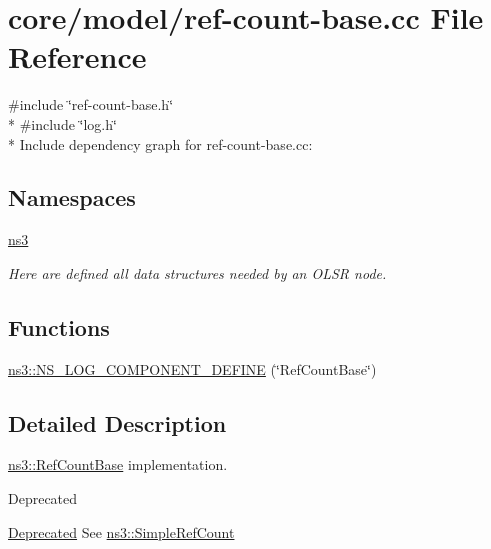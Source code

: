 \hypertarget{ref-count-base_8cc}{}\section{core/model/ref-\/count-\/base.cc File Reference}
\label{ref-count-base_8cc}
{\ttfamily \#include \char`\"{}ref-\/count-\/base.\+h\char`\"{}}\\*
{\ttfamily \#include \char`\"{}log.\+h\char`\"{}}\\*
Include dependency graph for ref-\/count-\/base.cc\+:
\subsection*{Namespaces}
\begin{DoxyCompactItemize}
\item 
 \hyperlink{namespacens3}{ns3}
\begin{DoxyCompactList}\small\item\em Here are defined all data structures needed by an O\+L\+SR node. \end{DoxyCompactList}\end{DoxyCompactItemize}
\subsection*{Functions}
\begin{DoxyCompactItemize}
\item 
\hyperlink{namespacens3_ac6d61fb06956f80934e4c3fa8adb92d4}{ns3\+::\+N\+S\+\_\+\+L\+O\+G\+\_\+\+C\+O\+M\+P\+O\+N\+E\+N\+T\+\_\+\+D\+E\+F\+I\+NE} (\char`\"{}Ref\+Count\+Base\char`\"{})
\end{DoxyCompactItemize}


\subsection{Detailed Description}
\hyperlink{classns3_1_1RefCountBase}{ns3\+::\+Ref\+Count\+Base} implementation. \begin{DoxyRefDesc}{Deprecated}
\item[\hyperlink{deprecated__deprecated000001}{Deprecated}]See \hyperlink{classns3_1_1SimpleRefCount}{ns3\+::\+Simple\+Ref\+Count} \end{DoxyRefDesc}
